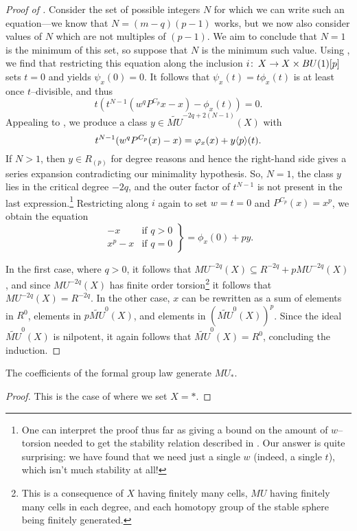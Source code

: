 \begin{proof}[{Proof of }]
Consider the set of possible integers $N$ for which we can write such an equation---we know that $N = (m-q)(p - 1)$ works, but we now also consider values of $N$ which are not multiples of $(p - 1)$.  We aim to conclude that $N = 1$ is the minimum of this set, so suppose that $N$ is the minimum such value.  Using , we find that restricting this equation along the inclusion $i\colon\thinspace X \to X \times BU(1)[p]$ sets $t = 0$ and yields $\psi_x(0) = 0$.  It follows that $\psi_x(t) = t \phi_x(t)$ is at least once $t$--divisible, and thus \[t (t^{N-1}(w^q P^{C_p}x - x) - \phi_x(t)) = 0.\]  Appealing to , we produce a class $y \in \widetilde{MU}^{-2q + 2(N-1)}(X)$ with \[t^{N-1}(w^q P^{C_p}(x) - x) = \varphi_x(x) + y \langle p\rangle(t).\]  If $N > 1$, then $y \in R_{(p)}$ for degree reasons and hence the right-hand side gives a series expansion contradicting our minimality hypothesis.  So, $N = 1$, the class $y$ lies in the critical degree $-2q$, and the outer factor of $t^{N-1}$ is not present in the last expression.\footnote{One can interpret the proof thus far as giving a bound on the amount of $w$--torsion needed to get the stability relation described in .  Our answer is quite surprising: we have found that we need just a single $w$ (indeed, a single $t$), which isn't much stability at all!}  Restricting along $i$ again to set $w = t = 0$ and $P^{C_p}(x) = x^p$, we obtain the equation \[\left. \begin{array}{rr} -x & \text{if $q > 0$} \\ x^p - x & \text{if $q = 0$} \end{array} \right\} = \phi_x(0) + py.\]

In the first case, where $q > 0$, it follows that $MU^{-2q}(X) \subseteq R^{-2q} + pMU^{-2q}(X)$, and since $MU^{-2q}(X)$ has finite order torsion\footnote{This is a consequence of $X$ having finitely many cells, $MU$ having finitely many cells in each degree, and each homotopy group of the stable sphere being finitely generated.} it follows that $MU^{-2q}(X) = R^{-2q}$.  In the other case, $x$ can be rewritten as a sum of elements in $R^{0}$, elements in $p \widetilde{MU}^{0}(X)$, and elements in $(\widetilde{MU}^0(X))^p$.  Since the ideal $\widetilde{MU}^0(X)$ is nilpotent, it again follows that $\widetilde{MU}^0(X) = R^0$, concluding the induction.
\end{proof}

\begin{corollary}\label{QuillenSurjective}
The coefficients of the formal group law generate $MU_*$.
\end{corollary}
\begin{proof}
This is the case of  where we set $X = *$.
\end{proof}

